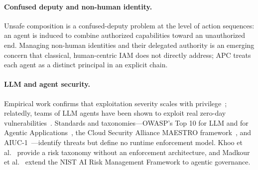 \documentclass[sigconf,nonacm]{acmart}
\begin{document}
\paragraph{Confused deputy and non-human identity.} Unsafe composition is a confused-deputy problem at the level of action sequences: an agent is induced to combine authorized capabilities toward an unauthorized end. Managing non-human identities and their delegated authority is an emerging concern that classical, human-centric IAM does not directly address; APC treats each agent as a distinct principal in an explicit chain.

\paragraph{LLM and agent security.} Empirical work confirms that exploitation severity scales with privilege~\cite{ruan2024, debenedetti2024}; relatedly, teams of LLM agents have been shown to exploit real zero-day vulnerabilities~\cite{hou2024}. Standards and taxonomies---OWASP's Top 10 for LLM and for Agentic Applications~\cite{owaspllm2025, owaspagentic2025, owaspmaestro2025}, the Cloud Security Alliance MAESTRO framework~\cite{csamaestro2025}, and AIUC-1~\cite{aiuc2025}---identify threats but define no runtime enforcement model. Khoo et al.~\cite{khoo2025} provide a risk taxonomy without an enforcement architecture, and Madkour et al.~\cite{madkour2026} extend the NIST AI Risk Management Framework to agentic governance.
\end{document}
